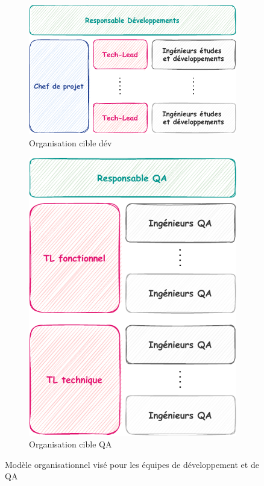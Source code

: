 \begin{figure}[H]
    \centering
    \begin{subfigure}[t]{0.53\textwidth}
        \includegraphics[width=\textwidth,]{images/sec3/organigrammedev.pdf}
        \caption{Organisation cible dév}
        \label{fig:subfig1}
    \end{subfigure}
    \hfill
    \begin{subfigure}[t]{0.39\textwidth}
        \includegraphics[width=\textwidth]{images/sec3/organigrammeqa.pdf}
        \caption{Organisation cible QA}
        \label{fig:subfig2}
    \end{subfigure}
    \caption{Modèle organisationnel visé pour les équipes de développement et de QA}
    \label{fig:devetqa}
\end{figure}
